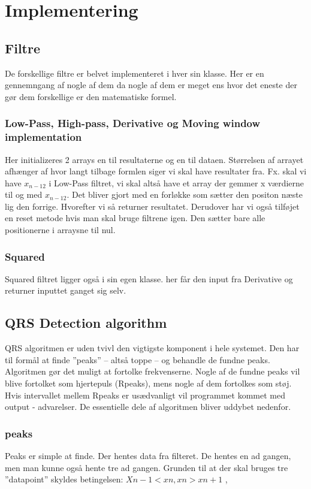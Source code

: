\documentclass[a4paper,12pt]{article}
\begin{document}
\section{Implementering}
\subsection{Filtre}
De forskellige filtre er belvet implementeret i hver sin klasse. Her er en gennemngang af nogle af dem da nogle af dem er meget ens hvor det eneste der gør dem forskellige er den matematiske formel.

\subsubsection{Low-Pass, High-pass, Derivative og Moving window implementation}
Her initializeres 2 arrays en til resultaterne og en til dataen. Størrelsen af arrayet afhænger af hvor langt tilbage formlen siger vi skal have resultater fra. Fx. skal vi have $x_{n-12}$ i Low-Pass filtret, vi skal altså have et array der gemmer x værdierne til og med $x_{n-12}$. Det bliver gjort med en forløkke som sætter den positon næste lig den forrige.
Hvorefter vi så returner resultatet. Derudover har vi også tilføjet en reset metode hvis man skal bruge filtrene igen. Den sætter bare alle positionerne i arraysne til nul.

\subsubsection{Squared}
Squared filtret ligger også i sin egen klasse. her får den input fra Derivative og returner inputtet ganget sig selv.

\subsection{QRS Detection algorithm}


QRS algoritmen er uden tvivl den vigtigste komponent i hele systemet. Den har til formål at finde ”peaks” – altså toppe – og behandle de fundne peaks. Algoritmen gør det muligt at fortolke frekvenserne. Nogle af de fundne peaks vil blive fortolket som hjertepuls (Rpeaks), mens nogle af dem fortolkes som støj. Hvis intervallet mellem Rpeaks er usædvanligt vil programmet kommet med output - advarelser. De essentielle dele af algoritmen bliver uddybet nedenfor.
\subsubsection{peaks}
Peaks er simple at finde. Der hentes data fra filteret. De hentes en ad gangen, men man kunne også hente tre ad gangen. Grunden til at der skal bruges tre ”datapoint” skyldes betingelsen:
$Xn-1 < xn, xn > xn+1$  ,  
\end{document}
